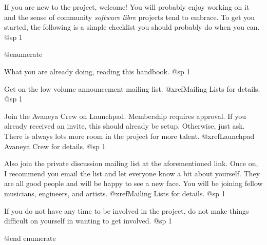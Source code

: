 
If you are new to the project, welcome! You will probably enjoy working on it and the sense of community {\sl software libre} projects tend to embrace. To get you started, the following is a simple checklist you should probably do when you can.
@sp 1

@enumerate

\item
What you are already doing, reading this handbook.
@sp 1

\item
Get on the low volume announcement mailing list. @xref{Mailing Lists} for details.
@sp 1

\item
Join the Avaneya Crew on Launchpad. Membership requires approval. If you already received an invite, this should already be setup. Otherwise, just ask. There is always lots more room in the project for more talent. @xref{Launchpad Avaneya Crew} for details.
@sp 1

\item
Also join the private discussion mailing list at the aforementioned link. Once on, I recommend you email the list and let everyone know a bit about yourself. They are all good people and will be happy to see a new face. You will be joining fellow musicians, engineers, and artists. @xref{Mailing Lists} for details.
@sp 1

\item
If you do not have any time to be involved in the project, do not make things difficult on yourself in wanting to get involved.
@sp 1

@end enumerate

